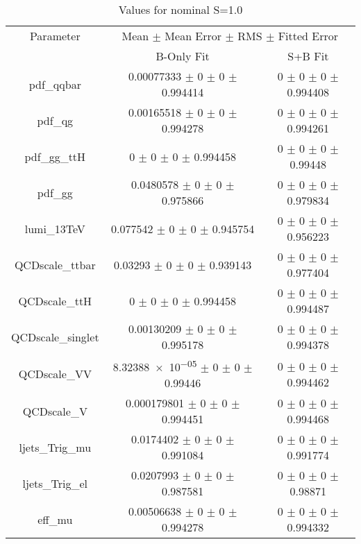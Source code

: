 \begin{table}
\centering
\caption{Values for nominal S=1.0}
\begin{tabular}{ccc}
\toprule
Parameter 	& \multicolumn{2}{c}{Mean $\pm$ Mean Error $\pm$ RMS $\pm$ Fitted Error}\\
 	& B-Only Fit & S+B Fit\\
\midrule
pdf\_qqbar 	& \num{0.00077333} $\pm$ \num{0} $\pm$ \num{0} $\pm$ \num{0.994414} 	& \num{0} $\pm$ \num{0} $\pm$ \num{0} $\pm$ \num{0.994408}\\
pdf\_qg 	& \num{0.00165518} $\pm$ \num{0} $\pm$ \num{0} $\pm$ \num{0.994278} 	& \num{0} $\pm$ \num{0} $\pm$ \num{0} $\pm$ \num{0.994261}\\
pdf\_gg\_ttH 	& \num{0} $\pm$ \num{0} $\pm$ \num{0} $\pm$ \num{0.994458} 	& \num{0} $\pm$ \num{0} $\pm$ \num{0} $\pm$ \num{0.99448}\\
pdf\_gg 	& \num{0.0480578} $\pm$ \num{0} $\pm$ \num{0} $\pm$ \num{0.975866} 	& \num{0} $\pm$ \num{0} $\pm$ \num{0} $\pm$ \num{0.979834}\\
lumi\_13TeV 	& \num{0.077542} $\pm$ \num{0} $\pm$ \num{0} $\pm$ \num{0.945754} 	& \num{0} $\pm$ \num{0} $\pm$ \num{0} $\pm$ \num{0.956223}\\
QCDscale\_ttbar 	& \num{0.03293} $\pm$ \num{0} $\pm$ \num{0} $\pm$ \num{0.939143} 	& \num{0} $\pm$ \num{0} $\pm$ \num{0} $\pm$ \num{0.977404}\\
QCDscale\_ttH 	& \num{0} $\pm$ \num{0} $\pm$ \num{0} $\pm$ \num{0.994458} 	& \num{0} $\pm$ \num{0} $\pm$ \num{0} $\pm$ \num{0.994487}\\
QCDscale\_singlet 	& \num{0.00130209} $\pm$ \num{0} $\pm$ \num{0} $\pm$ \num{0.995178} 	& \num{0} $\pm$ \num{0} $\pm$ \num{0} $\pm$ \num{0.994378}\\
QCDscale\_VV 	& \num{8.32388e-05} $\pm$ \num{0} $\pm$ \num{0} $\pm$ \num{0.99446} 	& \num{0} $\pm$ \num{0} $\pm$ \num{0} $\pm$ \num{0.994462}\\
QCDscale\_V 	& \num{0.000179801} $\pm$ \num{0} $\pm$ \num{0} $\pm$ \num{0.994451} 	& \num{0} $\pm$ \num{0} $\pm$ \num{0} $\pm$ \num{0.994468}\\
ljets\_Trig\_mu 	& \num{0.0174402} $\pm$ \num{0} $\pm$ \num{0} $\pm$ \num{0.991084} 	& \num{0} $\pm$ \num{0} $\pm$ \num{0} $\pm$ \num{0.991774}\\
ljets\_Trig\_el 	& \num{0.0207993} $\pm$ \num{0} $\pm$ \num{0} $\pm$ \num{0.987581} 	& \num{0} $\pm$ \num{0} $\pm$ \num{0} $\pm$ \num{0.98871}\\
eff\_mu 	& \num{0.00506638} $\pm$ \num{0} $\pm$ \num{0} $\pm$ \num{0.994278} 	& \num{0} $\pm$ \num{0} $\pm$ \num{0} $\pm$ \num{0.994332}\\

\end{tabular}
\end{table}
